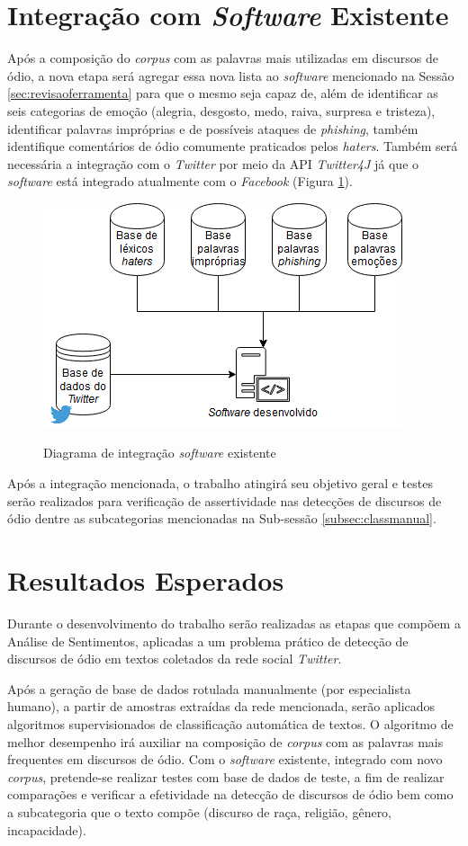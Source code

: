\section{Integração com \textit{Software} Existente}
\label{sec:integracaosoftware}
Após a composição do \textit{corpus} com as palavras mais utilizadas em discursos de ódio, a nova etapa será agregar essa nova lista ao \textit{software} mencionado na Sessão \ref{sec:revisaoferramenta} para que o mesmo seja capaz de, além de identificar as seis categorias de emoção (alegria, desgosto, medo, raiva, surpresa e tristeza), identificar palavras impróprias e de possíveis ataques de \textit{phishing}, também identifique comentários de ódio comumente praticados pelos \textit{haters}.
Também será necessária a integração com o \textit{Twitter} por meio da API \textit{Twitter4J} já que o \textit{software} está integrado atualmente com o \textit{Facebook} (Figura \ref{fig:implementacao}). 

\begin{figure}[!h]
\centering 
\caption{Diagrama de integração \textit{software} existente}
\includegraphics[scale=0.6]{imagens/implementacao.png}
\label{fig:implementacao}
\end{figure}
Após a integração mencionada, o trabalho atingirá seu objetivo geral e testes serão realizados para verificação de assertividade nas detecções de discursos de ódio dentre as subcategorias mencionadas na Sub-sessão \ref{subsec:classmanual}.

\section{Resultados Esperados}
Durante o desenvolvimento do trabalho serão realizadas as etapas que compõem a Análise de Sentimentos, aplicadas a um problema prático de detecção de discursos de ódio em textos coletados da rede social \textit{Twitter}.

Após a geração de base de dados rotulada manualmente (por especialista humano), a partir de amostras extraídas da rede mencionada, serão aplicados algoritmos supervisionados de classificação automática de textos. O algoritmo de melhor desempenho irá auxiliar na composição de \textit{corpus} com as palavras mais frequentes em discursos de ódio. Com o \textit{software} existente, integrado com novo \textit{corpus}, pretende-se realizar testes com base de dados de teste, a fim de realizar comparações e verificar a efetividade na detecção de discursos de ódio bem como a subcategoria que o texto compõe (discurso de raça, religião, gênero, incapacidade).